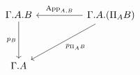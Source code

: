\[\begin{tikzcd}
	{\Gamma.A.B} && {\Gamma.A.(\Pi_{A}B)} \\
	\\
	{\Gamma.A}
	\arrow["{p_{B}}"', from=1-1, to=3-1]
	\arrow["{p_{\Pi_{A}B}}", from=1-3, to=3-1]
	\arrow["{\app_{A,B}}"', from=1-3, to=1-1]
\end{tikzcd}\]